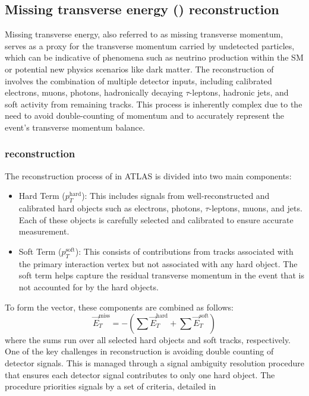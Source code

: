     \subsection{Missing transverse energy (\MET) reconstruction}
        Missing transverse energy, also referred to as missing transverse momentum, serves as a proxy for the transverse momentum 
        carried by undetected particles, which can be indicative of phenomena such as neutrino production within the SM or 
        potential new physics scenarios like dark matter.
        The reconstruction of \MET~\cite{JETM-2020-03} involves the combination of multiple detector inputs, including calibrated electrons, muons, photons, hadronically decaying 
        \(\tau\)-leptons, hadronic jets, and soft activity from remaining tracks. This process is inherently complex due to the need to avoid double-counting 
        of momentum and to accurately represent the event's transverse momentum balance.
        \subsubsection{\MET reconstruction}
            The reconstruction process of \MET in ATLAS is divided into two main components:
            \begin{itemize}
                \item Hard Term (\(p_T^{\text{hard}}\)): This includes signals from well-reconstructed and calibrated hard objects such as electrons, 
                photons, \(\tau\)-leptons, muons, and jets. Each of these objects is carefully selected and calibrated to ensure accurate measurement.
                \item Soft Term (\(p_T^{\text{soft}}\)): This consists of contributions from tracks associated with the primary interaction vertex but not 
                associated with any hard object. The soft term helps capture the residual transverse momentum in the event that is not accounted for by the hard objects.
            \end{itemize}
            To form the \MET vector, these components are combined as follows:
            \[ 
            \vec{E}_T^{\text{miss}} = - \left( \sum \vec{E}_T^{\text{hard}} + \sum \vec{E}_T^{\text{soft}} \right)
            \]
            where the sums run over all selected hard objects and soft tracks, respectively.
            One of the key challenges in \MET reconstruction is avoiding double counting of detector signals. This is managed through a signal ambiguity resolution 
            procedure that ensures each detector signal contributes to only one hard object. The procedure priorities signals by a set of criteria, detailed in~\cite{olr:exact}
